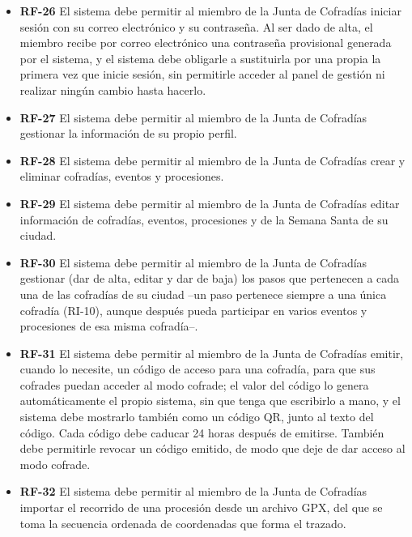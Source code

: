 \begin{itemize}
    \item \textbf{RF-26}  El sistema debe permitir al miembro de la Junta de Cofradías iniciar sesión con su correo electrónico y su contraseña. Al ser dado de alta, el miembro recibe por correo electrónico una contraseña provisional generada por el sistema, y el sistema debe obligarle a sustituirla por una propia la primera vez que inicie sesión, sin permitirle acceder al panel de gestión ni realizar ningún cambio hasta hacerlo.

    \item \textbf{RF-27}  El sistema debe permitir al miembro de la Junta de Cofradías gestionar la información de su propio perfil.

    \item \textbf{RF-28}  El sistema debe permitir al miembro de la Junta de Cofradías crear y eliminar cofradías, eventos y procesiones.

    \item \textbf{RF-29}  El sistema debe permitir al miembro de la Junta de Cofradías editar información de cofradías, eventos, procesiones y de la Semana Santa de su ciudad.

    \item \textbf{RF-30}  El sistema debe permitir al miembro de la Junta de Cofradías gestionar (dar de alta, editar y dar de baja) los pasos que pertenecen a cada una de las cofradías de su ciudad --un paso pertenece siempre a una única cofradía (RI-10), aunque después pueda participar en varios eventos y procesiones de esa misma cofradía--.

    \item \textbf{RF-31}  El sistema debe permitir al miembro de la Junta de Cofradías emitir, cuando lo necesite, un código de acceso para una cofradía, para que sus cofrades puedan acceder al modo cofrade; el valor del código lo genera automáticamente el propio sistema, sin que tenga que escribirlo a mano, y el sistema debe mostrarlo también como un código QR, junto al texto del código. Cada código debe caducar 24 horas después de emitirse. También debe permitirle revocar un código emitido, de modo que deje de dar acceso al modo cofrade.

    \item \textbf{RF-32}  El sistema debe permitir al miembro de la Junta de Cofradías importar el recorrido de una procesión desde un archivo GPX, del que se toma la secuencia ordenada de coordenadas que forma el trazado.


\end{itemize}
